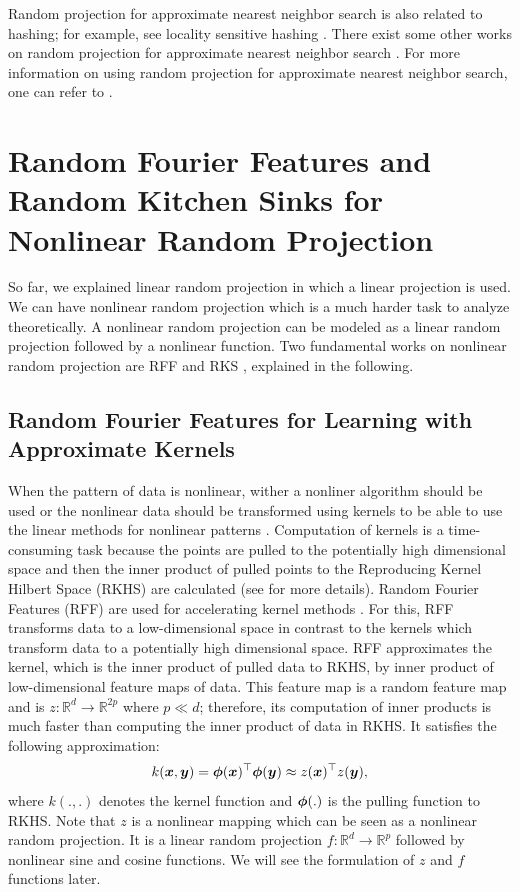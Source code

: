 \documentclass{article}
\def\b{\ensuremath\boldsymbol}
\begin{document}
Random projection for approximate nearest neighbor search is also related to hashing; for example, see locality sensitive hashing \cite{slaney2008locality}.
There exist some other works on random projection for approximate nearest neighbor search \cite{indyk1998approximate,ailon2006approximate}. 
For more information on using random projection for approximate nearest neighbor search, one can refer to {\citep[Chapter 7]{vempala2005random}}.

\section{Random Fourier Features and Random Kitchen Sinks for Nonlinear Random Projection}\label{section_RFF_and_RKS}

So far, we explained linear random projection in which a linear projection is used. We can have nonlinear random projection which is a much harder task to analyze theoretically. A nonlinear random projection can be modeled as a linear random projection followed by a nonlinear function. Two fundamental works on nonlinear random projection are RFF \cite{rahimi2007random} and RKS \cite{rahimi2008weighted}, explained in the following. 

\subsection{Random Fourier Features for Learning with Approximate Kernels}

When the pattern of data is nonlinear, wither a nonliner algorithm should be used or the nonlinear data should be transformed using kernels to be able to use the linear methods for nonlinear patterns \cite{ghojogh2021reproducing}. 
Computation of kernels is a time-consuming task because the points are pulled to the potentially high dimensional space and then the inner product of pulled points to the Reproducing Kernel Hilbert Space (RKHS) are calculated (see \cite{ghojogh2021reproducing} for more details). 
Random Fourier Features (RFF) are used for accelerating kernel methods \cite{rahimi2007random}. 
For this, RFF transforms data to a low-dimensional space in contrast to the kernels which transform data to a potentially high dimensional space. RFF approximates the kernel, which is the inner product of pulled data to RKHS, by inner product of low-dimensional feature maps of data. This feature map is a random feature map and is $z: \mathbb{R}^d \rightarrow \mathbb{R}^{2p}$ where $p \ll d$; therefore, its computation of inner products is much faster than computing the inner product of data in RKHS. It satisfies the following approximation:
\begin{align}\label{equation_RFF_kernel_approximation}
k(\b{x}, \b{y}) = \b{\phi}(\b{x})^\top \b{\phi}(\b{y}) \approx z(\b{x})^\top z(\b{y}),
\end{align}
where $k(.,.)$ denotes the kernel function and $\b{\phi}(.)$ is the pulling function to RKHS. 
Note that $z$ is a nonlinear mapping which can be seen as a nonlinear random projection. It is a linear random projection $f : \mathbb{R}^d \rightarrow \mathbb{R}^{p}$ followed by nonlinear sine and cosine functions. We will see the formulation of $z$ and $f$ functions later. 
\end{document}

